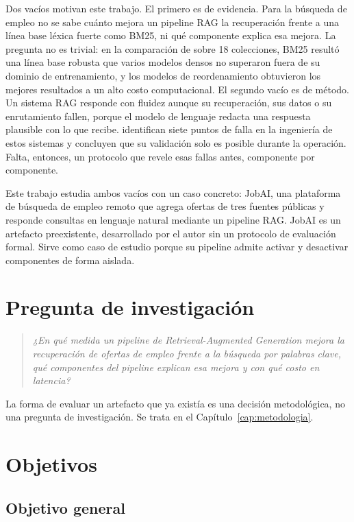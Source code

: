 Dos vacíos motivan este trabajo. El primero es de evidencia. Para la búsqueda de empleo no se sabe cuánto mejora un pipeline RAG la recuperación frente a una línea base léxica fuerte como BM25, ni qué componente explica esa mejora. La pregunta no es trivial: en la comparación de \citet{Thakur2021} sobre 18 colecciones, BM25 resultó una línea base robusta que varios modelos densos no superaron fuera de su dominio de entrenamiento, y los modelos de reordenamiento obtuvieron los mejores resultados a un alto costo computacional. El segundo vacío es de método. Un sistema RAG responde con fluidez aunque su recuperación, sus datos o su enrutamiento fallen, porque el modelo de lenguaje redacta una respuesta plausible con lo que recibe. \citet{Barnett2024} identifican siete puntos de falla en la ingeniería de estos sistemas y concluyen que su validación solo es posible durante la operación. Falta, entonces, un protocolo que revele esas fallas antes, componente por componente.

Este trabajo estudia ambos vacíos con un caso concreto: JobAI, una plataforma de búsqueda de empleo remoto que agrega ofertas de tres fuentes públicas y responde consultas en lenguaje natural mediante un pipeline RAG. JobAI es un artefacto preexistente, desarrollado por el autor sin un protocolo de evaluación formal. Sirve como caso de estudio porque su pipeline admite activar y desactivar componentes de forma aislada.

\section{Pregunta de investigación}

\begin{quote}
\textit{¿En qué medida un pipeline de Retrieval-Augmented Generation mejora la recuperación de ofertas de empleo frente a la búsqueda por palabras clave, qué componentes del pipeline explican esa mejora y con qué costo en latencia?}
\end{quote}

La forma de evaluar un artefacto que ya existía es una decisión metodológica, no una pregunta de investigación. Se trata en el Capítulo~\ref{cap:metodologia}.

\section{Objetivos}

\subsection{Objetivo general}

